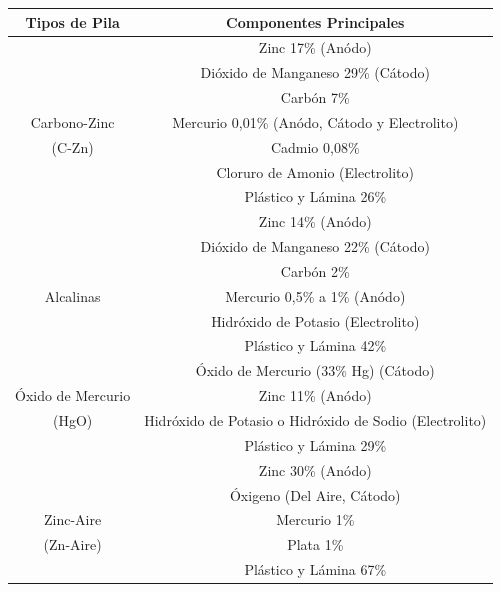                 \begin{table}[!htbp]
                    \centering
                    \begin{tabular}{|c|c|}
                         \hline
                         Tipos de Pila &  Componentes Principales\\
                         \hline
                         & Zinc 17\% (Anódo) \\
                         & Dióxido de Manganeso 29\% (Cátodo) \\
                         & Carbón 7\%\\
                         Carbono-Zinc & Mercurio 0,01\% (Anódo, Cátodo y Electrolito) \\
                         (C-Zn) & Cadmio 0,08\%\\
                         & Cloruro de Amonio (Electrolito)\\
                         & Plástico y Lámina 26\%\\
                         \hline
                         & Zinc 14\% (Anódo)\\
                         & Dióxido de Manganeso 22\% (Cátodo)\\
                         & Carbón 2\%\\
                         Alcalinas & Mercurio 0,5\% a 1\% (Anódo)\\
                         & Hidróxido de Potasio (Electrolito)\\
                         & Plástico y Lámina 42\%\\
                         \hline
                         & Óxido de Mercurio (33\% Hg) (Cátodo)\\
                         Óxido de Mercurio & Zinc 11\% (Anódo)\\
                         (HgO) & Hidróxido de Potasio o Hidróxido de Sodio (Electrolito)\\
                         & Plástico y Lámina 29\%\\
                         \hline
                         & Zinc 30\% (Anódo)\\
                         & Óxigeno (Del Aire, Cátodo)\\
                         Zinc-Aire & Mercurio 1\%\\
                         (Zn-Aire) & Plata 1\%\\
                         & Plástico y Lámina 67\%\\

\end{tabular}
\end{table}
